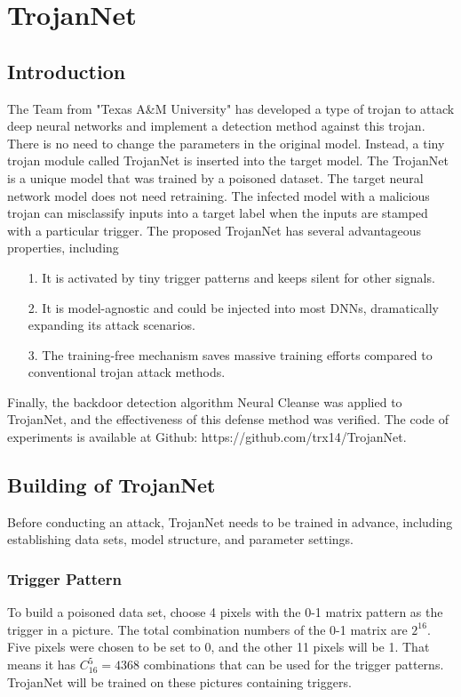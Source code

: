 \documentclass[english,version-2022-01]{uzl-thesis}
\begin{document}
\chapter{TrojanNet}
\label{TrojanNet}
\section{Introduction} The Team from "Texas A&M University" has developed a type of trojan to attack deep neural networks and implement a detection method against this trojan. There is no need to change the parameters in the original model. Instead, a tiny trojan module called TrojanNet is inserted into the target model. The TrojanNet is a unique model that was trained by a poisoned dataset. The target neural network model does not need retraining. The infected model with a malicious trojan can misclassify inputs into a target label when the inputs are stamped with a particular trigger.\cite{tang2020embarrassingly} The proposed TrojanNet has several advantageous properties, including 
\begin{itemize}
    \item[1.] It is activated by tiny trigger patterns and keeps silent for other signals.
    \item[2.] It is model-agnostic and could be injected into most DNNs, dramatically expanding its attack scenarios.
    \item[3.] The training-free mechanism saves massive training efforts compared to conventional trojan attack methods.
\end{itemize}
Finally, the backdoor detection algorithm Neural Cleanse was applied to TrojanNet, and the effectiveness of this defense method was verified. The code of experiments is available at Github: https://github.com/trx14/TrojanNet.\cite{tang2020embarrassingly}
\section{Building of TrojanNet}\label{Trojannet}
Before conducting an attack, TrojanNet needs to be trained in advance, including establishing data sets, model structure, and parameter settings.
\subsection{Trigger Pattern}To build a poisoned data set, choose 4 pixels with the 0-1 matrix pattern as the trigger in a picture. The total combination numbers of the 0-1 matrix are $2^{16}$. Five pixels were chosen to be set to 0, and the other 11 pixels will be 1. That means it has $C^{5}_{16}=4368$ combinations that can be used for the trigger patterns. TrojanNet will be trained on these pictures containing triggers.
\end{document}
